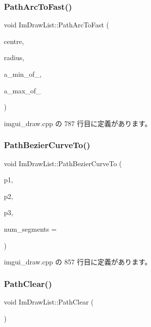 \subsubsection{\texorpdfstring{Path\+Arc\+To\+Fast()}{PathArcToFast()}}
{\footnotesize\ttfamily void Im\+Draw\+List\+::\+Path\+Arc\+To\+Fast (\begin{DoxyParamCaption}\item[{const \mbox{\hyperlink{struct_im_vec2}{Im\+Vec2}} \&}]{centre,  }\item[{float}]{radius,  }\item[{int}]{a\+\_\+min\+\_\+of\+\_,  }\item[{int}]{a\+\_\+max\+\_\+of\+\_ }\end{DoxyParamCaption})}



 imgui\+\_\+draw.\+cpp の 787 行目に定義があります。

\mbox{\label{struct_im_draw_list_a495ca7dd4fd5a898e2414658321f4b18}} 
\subsubsection{\texorpdfstring{Path\+Bezier\+Curve\+To()}{PathBezierCurveTo()}}
{\footnotesize\ttfamily void Im\+Draw\+List\+::\+Path\+Bezier\+Curve\+To (\begin{DoxyParamCaption}\item[{const \mbox{\hyperlink{struct_im_vec2}{Im\+Vec2}} \&}]{p1,  }\item[{const \mbox{\hyperlink{struct_im_vec2}{Im\+Vec2}} \&}]{p2,  }\item[{const \mbox{\hyperlink{struct_im_vec2}{Im\+Vec2}} \&}]{p3,  }\item[{int}]{num\+\_\+segments = {} }\end{DoxyParamCaption})}



 imgui\+\_\+draw.\+cpp の 857 行目に定義があります。

\mbox{\label{struct_im_draw_list_ae9ad5f4d638b1bfd9383618dc60e3f18}} 
\subsubsection{\texorpdfstring{Path\+Clear()}{PathClear()}}
{\footnotesize\ttfamily void Im\+Draw\+List\+::\+Path\+Clear (\begin{DoxyParamCaption}{ }\end{DoxyParamCaption})\hspace{0.3cm}{\ttfamily [inline]}}



